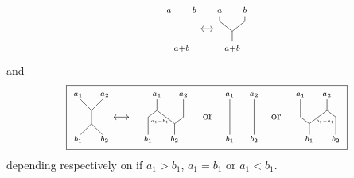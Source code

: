 \begin{definition}
\begin{equation*}
{\begin{tikzpicture}[scale=.4]
		\node[below] at (0,0){$\scriptstyle a+b$};
		\node[above] at (-1,2){$\scriptstyle a$};
		\node[above] at (1,2){$\scriptstyle b$};
		
		\draw[<->] (1.5,1)--(2.5,1);
		
		\path[draw] (4,0)--(4,0.8)--(3,1.6)--(3,2);
		\path[draw] (4,0.8)--(5,1.6)--(5,2);
		
		\node[below] at (4,0){$\scriptstyle a+b$};
		\node[above] at (3,2){$\scriptstyle a$};
		\node[above] at (5,2){$\scriptstyle b$};
		\end{tikzpicture}
	}
	\end{equation*}
	and 
	\begin{equation*}
	\boxed{
		\begin{tikzpicture}[scale=.7]
		\draw (0,.3)--(0,-.3);
		\draw (0,.3)--(.5,.8);\node at (.6,1){$\scriptstyle a_2$};
		\draw (0,.3)--(-.5,.8);\node at (-.6,1){$\scriptstyle a_1$};
		\draw (0,-.3)--(.5,-.8);\node at (.6,-1){$\scriptstyle b_2$};
		\draw (0,-.3)--(-.5,-.8);\node at (-.6,-1){$\scriptstyle b_1$};
		
		\draw[<->] (1,0)--(1.7,0);
		\end{tikzpicture}
		\ \ \
		\begin{tikzpicture}[scale=.7]
		\draw (-.9,.8)--(-.9,.3)--(-1.3,0)--(-1.3,-.8);
		\draw (-.9,.3)--(-.1,-.3);
		\draw (.3,.8)--(.3,0)--(-.1,-.3)--(-.1,-.8);
		\node at (1.4,0){ or };
		\node at (-.9,1){$\scriptstyle a_1$}; \node at (.3,1){$\scriptstyle a_2$};  		
		\node at (-1.3,-1){$\scriptstyle b_1$}; \node at (-.1,-1){$\scriptstyle b_2$}; 
		\draw (-.77,-.19) node[scale = .8] {$\scriptscriptstyle a_1-b_1$};	
		
		\draw (2.4,.8)--(2.4,-.8);
		\draw (3.5,.8)--(3.5,-.8);
		\node at (2.4,1){$\scriptstyle a_1$}; \node at (3.5,1){$\scriptstyle a_2$};  		
		\node at (2.4,-1){$\scriptstyle b_1$}; \node at (3.5,-1){$\scriptstyle b_2$}; 
		
		\node at (4.5,0){ or };
		\draw (5.6,.8)--(5.6,0)--(6,-.3)--(6,-.8);
		\draw (6,-.3)--(6.8,.3);
		\draw (6.8,.8)--(6.8,.3)--(7.2,0)--(7.2,-.8);
		\node at (5.6,1){$\scriptstyle a_1$}; \node at (6.8,1){$\scriptstyle a_2$};  		
		\node at (6,-1){$\scriptstyle b_1$}; \node at (7.2,-1){$\scriptstyle b_2$};
		\draw (6.72,-.19) node[scale = .8]{$\scriptscriptstyle b_1-a_1$}; 
		\end{tikzpicture}
	}
	\end{equation*}
	depending respectively on if $a_1 > b_1$, $a_1 = b_1$ or $a_1 < b_1$.
\end{definition}

